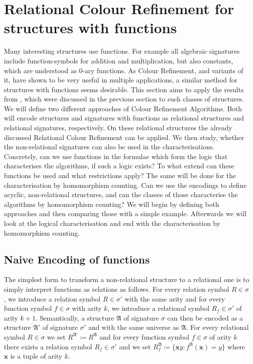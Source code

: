 \section{Relational Colour Refinement for structures with functions}
\label{sec:RelationalColourRefinemetForStructuresWithFunctions}

Many interesting structures use functions.
For example all algebraic signatures include function-symbols for addition and multiplication, but also constants, which are understood as $0$-ary functions.
As Colour Refinement, and variants of it, have shown to be very useful in multiple applications, a similar method for structures with functions seems desirable.
This section aims to apply the results from \cite{scheidt2025ColorRefinement}, which were discussed in the previous section to such classes of structures.
We will define two different approaches of Colour Refinement Algorithms.
Both will encode structures and signatures with functions as relational structures and relational signatures, respectively.
On these relational structures the already discussed Relational Colour Refinement can be applied.
We then study, whether the non-relational signatures can also be used in the characterisations.
Concretely, can we use functions in the formulae which form the logic that characterises the algorithms, if such a logic exists?
To what extend can these functions be used and what restrictions apply?
The same will be done for the characterisation by homomorphism counting.
Can we use the encodings to define acyclic, non-relational structures, and can the classes of those characterise the algorithms by homomorphism counting?
We will begin by defining both approaches and then comparing those with a simple example.
Afterwards we will look at the logical characterisation and end with the characterisation by homomorphism counting.


\subsection{Naive Encoding of functions}
\label{Sec::NaiveEncodingOfFunctions}

The simplest form to transform a non-relational structure to a relational one is to simply interpret functions as relations as follows.
For every relation symbol $R\in \sigma$, we introduce a relation symbol $R\in \sigma'$ with the same arity and for every function symbol $f\in\sigma$ with arity $k$, we introduce a relational symbol $R_f\in\sigma'$ of arity $k+1$.
Semantically, a structure $\mathfrak A$ of signature $\sigma$ can then be encoded as a structure $\mathfrak A'$ of signature $\sigma'$ and with the same universe as $\mathfrak A$. 
For every relational symbol $R\in\sigma$ we set $R^{\mathfrak A'}\coloneqq R^{\mathfrak A}$ and for every function symbol $f\in\sigma$ of arity $k$ there exists a relation symbol $R_f\in\sigma'$ and we set $R_f^{\mathfrak A}\coloneqq \{\mathbf xy : f^{\mathfrak A}(\mathbf x)=y\}$ where $\mathbf x$ is a tuple of arity $k$.

